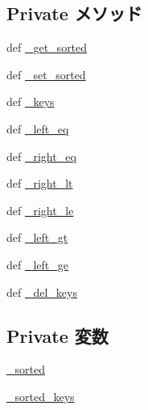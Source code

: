 \subsection*{Private メソッド}
\begin{DoxyCompactItemize}
\item 
def \hyperlink{classm5_1_1util_1_1sorteddict_1_1SortedDict_a2539ea1cd1d553bd77d7844b89f21b3e}{\_\-get\_\-sorted}
\item 
def \hyperlink{classm5_1_1util_1_1sorteddict_1_1SortedDict_aeeede65b4f06d4e64bae6ce039707ec6}{\_\-set\_\-sorted}
\item 
def \hyperlink{classm5_1_1util_1_1sorteddict_1_1SortedDict_a0bbd4b7e94da8d85f536d66c9d6c8ac0}{\_\-keys}
\item 
def \hyperlink{classm5_1_1util_1_1sorteddict_1_1SortedDict_a220ecd5f641dbe0ace0ff5af843336ec}{\_\-left\_\-eq}
\item 
def \hyperlink{classm5_1_1util_1_1sorteddict_1_1SortedDict_ad7b913bb0777a4cc32f40f4ef56065b7}{\_\-right\_\-eq}
\item 
def \hyperlink{classm5_1_1util_1_1sorteddict_1_1SortedDict_a1406853747d03fe18f7fb02022fca513}{\_\-right\_\-lt}
\item 
def \hyperlink{classm5_1_1util_1_1sorteddict_1_1SortedDict_aecca0782b1d8d3ed8178263d64114923}{\_\-right\_\-le}
\item 
def \hyperlink{classm5_1_1util_1_1sorteddict_1_1SortedDict_a010098bbcf9a823de34651f46ec2f04a}{\_\-left\_\-gt}
\item 
def \hyperlink{classm5_1_1util_1_1sorteddict_1_1SortedDict_a4601619ab3ade344020b159cbd5ef089}{\_\-left\_\-ge}
\item 
def \hyperlink{classm5_1_1util_1_1sorteddict_1_1SortedDict_a8fcf3ad957c4d91952c16bf7319a050a}{\_\-del\_\-keys}
\end{DoxyCompactItemize}
\subsection*{Private 変数}
\begin{DoxyCompactItemize}
\item 
\hyperlink{classm5_1_1util_1_1sorteddict_1_1SortedDict_adf902ff1a2e676ffc53c792f0ee4ff06}{\_\-sorted}
\item 
\hyperlink{classm5_1_1util_1_1sorteddict_1_1SortedDict_aa31cdc0ed3041a75679ebf1ea5661b84}{\_\-sorted\_\-keys}
\end{DoxyCompactItemize}


